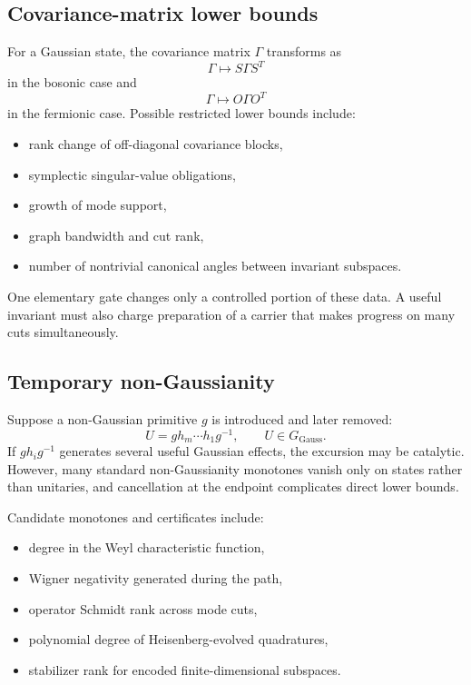 \subsection{Covariance-matrix lower bounds}
For a Gaussian state, the covariance matrix $\Gamma$ transforms as
\[
\Gamma\longmapsto S\Gamma S^T
\]
in the bosonic case and
\[
\Gamma\longmapsto O\Gamma O^T
\]
in the fermionic case.  Possible restricted lower bounds include:
\begin{itemize}
\item rank change of off-diagonal covariance blocks,
\item symplectic singular-value obligations,
\item growth of mode support,
\item graph bandwidth and cut rank,
\item number of nontrivial canonical angles between invariant subspaces.
\end{itemize}
One elementary gate changes only a controlled portion of these data.  A useful invariant must also charge preparation of a carrier that makes progress on many cuts simultaneously.

\subsection{Temporary non-Gaussianity}
Suppose a non-Gaussian primitive $g$ is introduced and later removed:
\[
U=g h_m\cdots h_1 g^{-1},
\qquad U\in G_{\mathrm{Gauss}}.
\]
If $g h_i g^{-1}$ generates several useful Gaussian effects, the excursion may be catalytic.  However, many standard non-Gaussianity monotones vanish only on states rather than unitaries, and cancellation at the endpoint complicates direct lower bounds.

Candidate monotones and certificates include:
\begin{itemize}
\item degree in the Weyl characteristic function,
\item Wigner negativity generated during the path,
\item operator Schmidt rank across mode cuts,
\item polynomial degree of Heisenberg-evolved quadratures,
\item stabilizer rank for encoded finite-dimensional subspaces.
\end{itemize}

